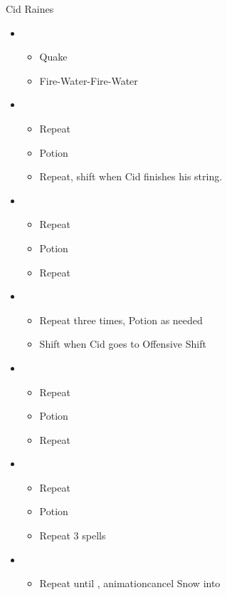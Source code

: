 	\begin{battle}[1:43]{Cid Raines}
		\begin{itemize}
			\item \first
			      \begin{itemize}
				      \item Quake
				      \item Fire-Water-Fire-Water
			      \end{itemize}
			\item \third
			      \begin{itemize}
				      \item Repeat
				      \item Potion
				      \item Repeat, shift when Cid finishes his string.
			      \end{itemize}
			\item \fifth
			      \begin{itemize}
				      \item Repeat
				      \item Potion
				      \item Repeat
			      \end{itemize}
			\item \second
			      \begin{itemize}
				      \item Repeat three times, Potion as needed
				      \item Shift when Cid goes to Offensive Shift
			      \end{itemize}
			\item \third
			      \begin{itemize}
				      \item Repeat
				      \item Potion
				      \item Repeat
			      \end{itemize}
			\item \fourth
			      \begin{itemize}
				      \item Repeat
				      \item Potion
				      \item Repeat 3 spells
			      \end{itemize}
			\item \second
			      \begin{itemize}
				      \item Repeat until \stagger, animationcancel Snow into
			      \end{itemize}

\end{itemize}
\end{battle}
